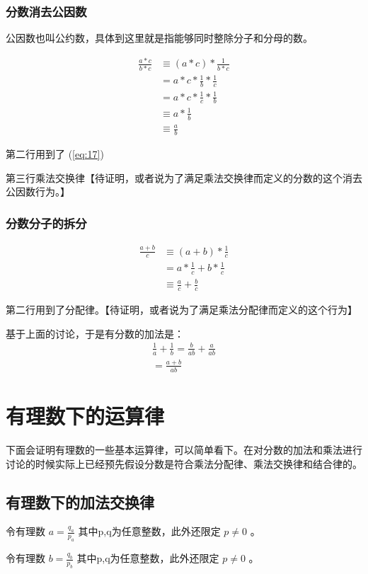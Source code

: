 \documentclass[12pt,oneside]{book}
\begin{document}
\subsubsection{分数消去公因数}
公因数也叫公约数，具体到这里就是指能够同时整除分子和分母的数。

\begin{align*}
\frac{a*c}{b*c} &\equiv (a * c) * \frac{1}{b*c}\\
&=a * c * \frac{1}{b} * \frac{1}{c}\\
&=a*c*\frac{1}{c}*\frac{1}{b}\\
&\equiv a*\frac{1}{b}\\
&\equiv \frac{a}{b}
\end{align*}

第二行用到了 (\ref{eq:17})

第三行乘法交换律【待证明，或者说为了满足乘法交换律而定义的分数的这个消去公因数行为。】

\subsubsection{分数分子的拆分}
\begin{align*}
\frac{a+b}{c} &\equiv (a+b) * \frac{1}{c}\\
&=a* \frac{1}{c} + b* \frac{1}{c}\\
&\equiv \frac{a}{c} + \frac{b}{c}
\end{align*}

第二行用到了分配律。【待证明，或者说为了满足乘法分配律而定义的这个行为】


基于上面的讨论，于是有分数的加法是：
\begin{align*}
\frac{1}{a} + \frac{1}{b} = \frac{b}{ab} + \frac{a}{ab}\\
= \frac{a+b}{ab}
\end{align*}

\section{有理数下的运算律}
下面会证明有理数的一些基本运算律，可以简单看下。在对分数的加法和乘法进行讨论的时候实际上已经预先假设分数是符合乘法分配律、乘法交换律和结合律的。

\subsection{有理数下的加法交换律}
令有理数 $a = \frac{q_a}{p_a}$ 其中p,q为任意整数，此外还限定 $p \neq 0$ 。

令有理数 $b = \frac{q_b}{p_b}$ 其中p,q为任意整数，此外还限定 $p \neq 0$ 。
\end{document}
